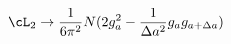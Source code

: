 \begin{equation}
\cL_2 \rightarrow \frac{1}{6 \pi^2} N ( 2 g_a^2 - \frac{1}{\Delta a^2} 
g_a g_{a + \Delta a} )
\end{equation} 

